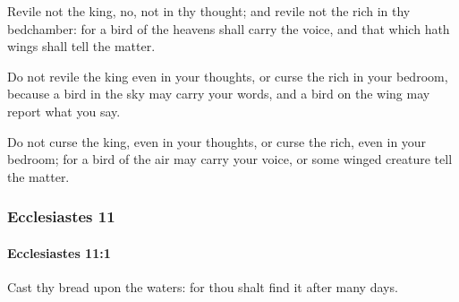 			\begin{versebox}
					\item[BHS] 
					\item[LXX] 
					\item[ASV] Revile not the king, no, not in thy thought; and revile not the rich in thy bedchamber: for a bird of the heavens shall carry the voice, and that which hath wings shall tell the matter.
					\item[NIV] Do not revile the king even in your thoughts, or curse the rich in your bedroom, because a bird in the sky may carry your words, and a bird on the wing may report what you say.
					\item[NRSV] Do not curse the king, even in your thoughts, or curse the rich, even in your bedroom; for a bird of the air may carry your voice, or some winged creature tell the matter.
			\end{versebox}
	\subsubsection{Ecclesiastes 11} %
		\label{ECCLESIASTES-11}

		\paragraph{Ecclesiastes 11:1} %
			\label{ECCLESIASTES-11-1}

			Cast thy bread upon the waters: for thou shalt find it after many days.

